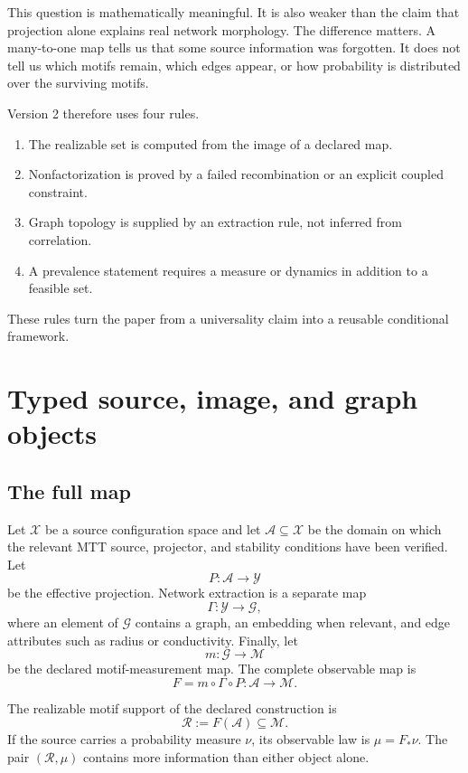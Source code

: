 \documentclass[11pt]{article}
\newcommand{\Adm}{\mathcal A}
\newcommand{\Image}{\mathcal R}
\newcommand{\Motif}{\mathcal M}
\newcommand{\Graphs}{\mathcal G}
\newcommand{\Coherent}{\mathcal X}
\newcommand{\Effective}{\mathcal Y}
\begin{document}
This question is mathematically meaningful.  It is also weaker than the
claim that projection alone explains real network morphology.  The
difference matters.  A many-to-one map tells us that some source information
was forgotten.  It does not tell us which motifs remain, which edges appear,
or how probability is distributed over the surviving motifs.

Version 2 therefore uses four rules.

\begin{enumerate}
\item The realizable set is computed from the image of a declared map.
\item Nonfactorization is proved by a failed recombination or an explicit
coupled constraint.
\item Graph topology is supplied by an extraction rule, not inferred from
correlation.
\item A prevalence statement requires a measure or dynamics in addition to
a feasible set.
\end{enumerate}

These rules turn the paper from a universality claim into a reusable
conditional framework.

\section{Typed source, image, and graph objects}

\subsection{The full map}

Let $\Coherent$ be a source configuration space and let
$\Adm\subseteq\Coherent$ be the domain on which the relevant MTT source,
projector, and stability conditions have been verified.  Let
\[
  P:\Adm\longrightarrow\Effective
\]
be the effective projection.  Network extraction is a separate map
\[
  \Gamma:\Effective\longrightarrow\Graphs,
\]
where an element of $\Graphs$ contains a graph, an embedding when relevant,
and edge attributes such as radius or conductivity.  Finally, let
\[
  m:\Graphs\longrightarrow\Motif
\]
be the declared motif-measurement map.  The complete observable map is
\[
  F=m\circ\Gamma\circ P:\Adm\longrightarrow\Motif.
\]

\begin{definition}
The realizable motif support of the declared construction is
\[
  \Image:=F(\Adm)\subseteq\Motif.
\]
If the source carries a probability measure $\nu$, its observable law is
$\mu=F_\ast\nu$.  The pair $(\Image,\mu)$ contains more information than
either object alone.
\end{definition}
\end{document}
